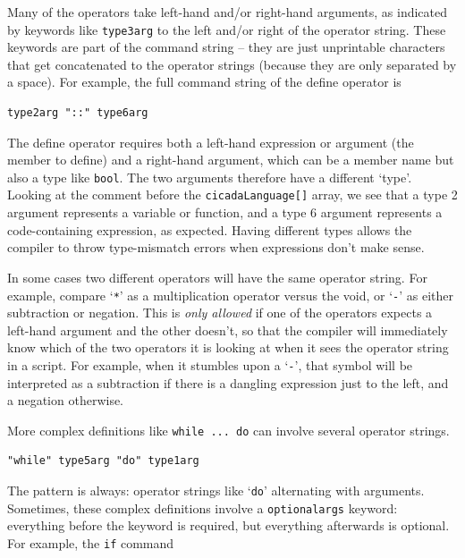 \documentclass{article}
\newenvironment{code}{
       \begin{list}{}{
               \setlength{\leftmargin}{.4in}
               \setlength{\rightmargin}{0in}
               \setlength{\topsep}{.2in}
       }
       \small
       \item[] }
       { \end{list}   }
\begin{document}
Many of the operators take left-hand and/or right-hand arguments, as indicated by keywords like \verb#type3arg# to the left and/or right of the operator string.  These keywords are part of the command string -- they are just unprintable characters that get concatenated to the operator strings (because they are only separated by a space).  For example, the full command string of the define operator is

\begin{code} \begin{verbatim}
type2arg "::" type6arg
\end{verbatim} \end{code}

\noindent The define operator requires both a left-hand expression or argument (the member to define) and a right-hand argument, which can be a member name but also a type like \verb#bool#.  The two arguments therefore have a different `type'.  Looking at the comment before the \verb#cicadaLanguage[]# array, we see that a type 2 argument represents a variable or function, and a type 6 argument represents a code-containing expression, as expected.  Having different types allows the compiler to throw type-mismatch errors when expressions don't make sense.

In some cases two different operators will have the same operator string.  For example, compare `\verb#*#' as a multiplication operator versus the void, or `\verb#-#' as either subtraction or negation.  This is \emph{only allowed} if one of the operators expects a left-hand argument and the other doesn't, so that the compiler will immediately know which of the two operators it is looking at when it sees the operator string in a script.  For example, when it stumbles upon a `\verb#-#', that symbol will be interpreted as a subtraction if there is a dangling expression just to the left, and a negation otherwise.

More complex definitions like \verb#while ... do# can involve several operator strings.

\begin{code} \begin{verbatim}
"while" type5arg "do" type1arg
\end{verbatim} \end{code}

\noindent The pattern is always:  operator strings like `\verb#do#' alternating with arguments.  Sometimes, these complex definitions involve a \verb#optionalargs# keyword:  everything before the keyword is required, but everything afterwards is optional.  For example, the \verb#if# command
\end{document}
